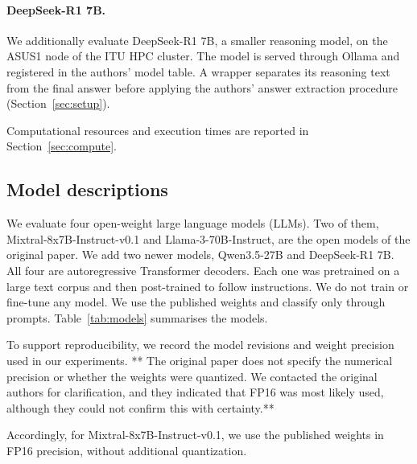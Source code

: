\paragraph{DeepSeek-R1 7B.}
\mbox{}\par
We additionally evaluate DeepSeek-R1 7B,
a smaller reasoning model, on the ASUS1
node of the ITU HPC cluster. The model
is served through Ollama and registered
in the authors' model table. A wrapper
separates its reasoning text from the
final answer before applying the authors'
answer extraction procedure (Section~\ref{sec:setup}).

Computational resources and execution times
are reported in Section~\ref{sec:compute}.


\subsection{Model descriptions}
\label{sec:models}

We evaluate four open-weight large language models (LLMs). Two of them,
Mixtral-8x7B-Instruct-v0.1 and Llama-3-70B-Instruct, are the open models of the
original paper. We add two newer models, Qwen3.5-27B and DeepSeek-R1 7B. All
four are autoregressive Transformer decoders. Each one was pretrained on a
large text corpus and then post-trained to follow instructions. We do not
train or fine-tune any model. We use the published weights and classify
only through prompts. Table~\ref{tab:models} summarises the models.

\par\medskip

To support reproducibility, we record the model revisions and weight
precision used in our experiments.  ** The original paper does not specify
the numerical precision or whether the weights were quantized. We contacted
the original authors for clarification, and they indicated that FP16 was
most likely used, although they could not confirm this with certainty.** 

\par\medskip

Accordingly, for Mixtral-8x7B-Instruct-v0.1, we use the published weights
in FP16 precision, without additional quantization.

